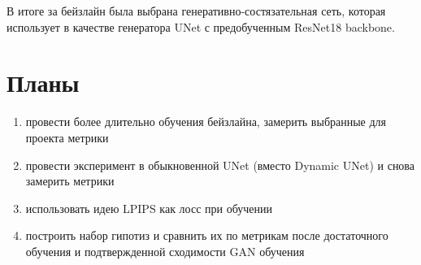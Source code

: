 \documentclass[14pt]{article}
\begin{document}
В итоге за бейзлайн была выбрана генеративно-состязательная сеть, которая
использует в качестве генератора UNet с предобученным ResNet18 backbone.

\section{Планы}

\begin{enumerate}
    \item провести более длительно обучения бейзлайна, замерить выбранные для проекта метрики
    \item провести эксперимент в обыкновенной UNet (вместо Dynamic UNet) и снова замерить метрики
    \item использовать идею LPIPS как лосс при обучении
    \item построить набор гипотиз и сравнить их по метрикам после достаточного обучения и подтвержденной сходимости GAN обучения
\end{enumerate}


\pagebreak
\printbibliography
\end{document}
